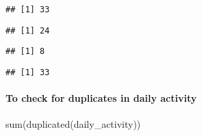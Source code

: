 \documentclass[
]{article}
\newenvironment{Shaded}{\begin{snugshade}}{\end{snugshade}}
\newcommand{\CommentTok}[1]{\textcolor[rgb]{0.56,0.35,0.01}{\textit{#1}}}
\newcommand{\FunctionTok}[1]{\textcolor[rgb]{0.00,0.00,0.00}{#1}}
\newcommand{\NormalTok}[1]{#1}
\newcommand{\SpecialCharTok}[1]{\textcolor[rgb]{0.00,0.00,0.00}{#1}}
\begin{document}
\begin{verbatim}
## [1] 33
\end{verbatim}

\begin{Shaded}
\end{Shaded}

\begin{verbatim}
## [1] 24
\end{verbatim}

\begin{Shaded}
\end{Shaded}

\begin{verbatim}
## [1] 8
\end{verbatim}

\begin{Shaded}
\end{Shaded}

\begin{verbatim}
## [1] 33
\end{verbatim}

\hypertarget{to-check-for-duplicates-in-daily-activity}{%
\paragraph{To check for duplicates in daily
activity}\label{to-check-for-duplicates-in-daily-activity}}

\begin{Shaded}
\begin{Highlighting}[]
\FunctionTok{sum}\NormalTok{(}\FunctionTok{duplicated}\NormalTok{(daily\_activity))}
\end{Highlighting}
\end{Shaded}
\end{document}
